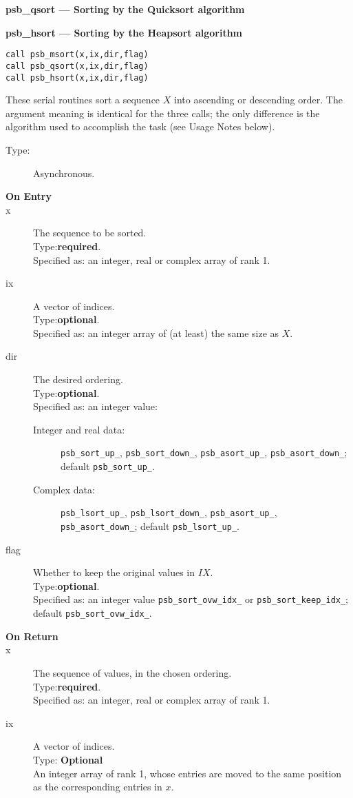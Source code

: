 {\par\noindent\large\bfseries psb\_qsort --- Sorting by the Quicksort
  algorithm}

{\par\noindent\large\bfseries psb\_hsort --- Sorting by the Heapsort  algorithm}
\begin{verbatim}
call psb_msort(x,ix,dir,flag)
call psb_qsort(x,ix,dir,flag)
call psb_hsort(x,ix,dir,flag)
\end{verbatim}

These  serial routines sort a sequence $X$ into ascending or
descending  order. The argument meaning is identical for the three
calls; the only difference is the algorithm used to accomplish the
task (see Usage Notes below). 
\begin{description}
\item[Type:] Asynchronous.
\item[\bf  On Entry ]
\item[x] The sequence to be sorted.\\
Type:{\bf required}.\\
Specified as: an integer, real or complex  array of rank 1.
\item[ix] A vector of indices.\\
Type:{\bf optional}.\\
Specified as: an integer array of (at least) the same size as $X$.
\item[dir] The desired ordering.\\
Type:{\bf optional}.\\
Specified as: an integer value: \begin{description}
\item[Integer and real data:] \verb|psb_sort_up_|,
\verb|psb_sort_down_|, \verb|psb_asort_up_|, \verb|psb_asort_down_|;
default \verb|psb_sort_up_|. 
\item[Complex data:] \verb|psb_lsort_up_|,
\verb|psb_lsort_down_|, \verb|psb_asort_up_|, \verb|psb_asort_down_|;
default \verb|psb_lsort_up_|. 
\end{description}
\item[flag] Whether to keep the original values in $IX$.\\
Type:{\bf optional}.\\
Specified as: an integer value \verb|psb_sort_ovw_idx_| or
\verb|psb_sort_keep_idx_|; default \verb|psb_sort_ovw_idx_|.

\end{description}

\begin{description}
\item[\bf On Return]
\item[x] The sequence of values, in the chosen ordering.\\ 
Type:{\bf required}.\\
Specified as: an integer, real or complex array of rank 1.
\item[ix] A vector of indices.\\
Type: {\bf Optional} \\
An integer array of rank 1, whose entries are moved to the same
position as the corresponding entries in $x$.
\end{description}

